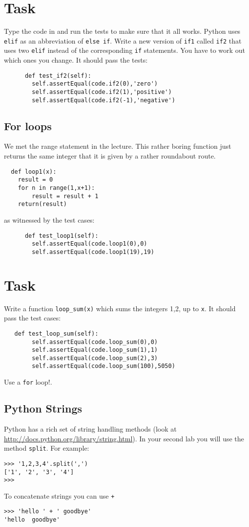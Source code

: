 \documentclass{paper}
\begin{document}
\section{Task}
Type the code in and run the tests to make sure that it all
works. Python uses {\tt elif} as an abbreviation of {\tt else
  if}. Write a new version of {\tt if1} called {\tt if2} that uses
two {\tt elif} instead of the corresponding {\tt if} statements. You
have to work out which ones you change. It should pass the tests:
\begin{lstlisting}
      def test_if2(self):
        self.assertEqual(code.if2(0),'zero')
        self.assertEqual(code.if2(1),'positive')
        self.assertEqual(code.if2(-1),'negative')
\end{lstlisting}

\subsection*{For loops}
We met the range statement in the lecture. This rather boring function
just returns the same integer that it is given by a rather roundabout
route.
\begin{lstlisting}
  def loop1(x):
    result = 0
    for n in range(1,x+1):
        result = result + 1
    return(result)
\end{lstlisting}
as witnessed by the test cases:
\begin{lstlisting}
      def test_loop1(self):
        self.assertEqual(code.loop1(0),0)
        self.assertEqual(code.loop1(19),19)
\end{lstlisting}

\section{Task}
Write a function {\tt loop\_sum(x)} which sums the integers 1,2, up to
{\tt x}. It should pass the test cases:
\begin{lstlisting}
   def test_loop_sum(self):
        self.assertEqual(code.loop_sum(0),0)
        self.assertEqual(code.loop_sum(1),1)
        self.assertEqual(code.loop_sum(2),3)
        self.assertEqual(code.loop_sum(100),5050)
\end{lstlisting}
Use a {\tt for} loop!.

\subsection*{Python Strings}

Python has a rich set of string handling methods (look at \url{http://docs.python.org/library/string.html}). In your second lab
you will use the  method {\tt split}. For example:
\begin{verbatim}
>>> '1,2,3,4'.split(',')
['1', '2', '3', '4']
>>>
\end{verbatim}
To concatenate strings you can use {\tt +}
\begin{verbatim}
>>> 'hello ' + ' goodbye'
'hello  goodbye'
\end{verbatim}
\end{document}
